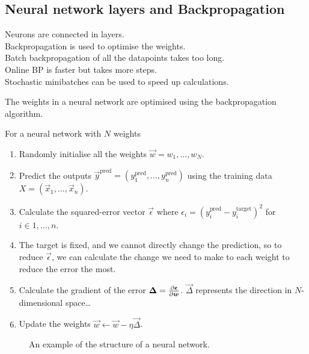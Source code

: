 \subsection{Neural network layers and Backpropagation} \label{sec:backpropagation}

\begin{todo}
	Neurons are connected in layers. \\
	Backpropagation is used to optimise the weights. \\
	Batch backpropagation of all the datapoints takes too long. \\
	Online BP is faster but takes more steps. \\
	Stochastic minibatches can be used to speed up calculations. 
\end{todo}

The weights in a neural network are optimised using the backpropagation algorithm.

\begin{todo}
	
	For a neural network with \(N\) weights
	\begin{enumerate}
		\item Randomly initialise all the weights \(\vec{w} = w_1, \dots, w_N\).
		\item Predict the outputs \(\vec{y}^\text{pred} = (y^\text{pred}_1, \dots, y^\text{pred}_n)\) using the training data \(X = (\vec{x}_1, \dots, \vec{x}_n)\).
		\item Calculate the squared-error vector \(\vec{\epsilon}\) where \(\epsilon_i = (y_i^\text{pred} - y_i^\text{target})^2\) for \(i \in 1, \dots, n\).
		\item The target is fixed, and we cannot directly change the prediction, so to reduce \(\vec{\epsilon}\), we can calculate the change we need to make to each weight to reduce the error the most.
		\item Calculate the gradient of the error \(\bm{\Delta} = \pdv{\bm{\epsilon}}{\bm{w}}\). \(\vec{\Delta}\) represents the direction in \(N\)-dimensional space\dots
		\item Update the weights \(\vec{w} \leftarrow \vec{w} - \eta \vec{\Delta}\).
	\end{enumerate}
\end{todo}

\begin{figure}[htbp]
	\centering
	
	\caption{An example of the structure of a neural network.}
	\label{fig:neural-network-example}
\end{figure}

